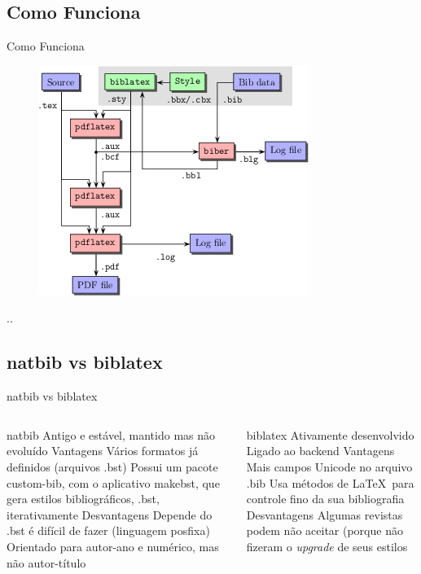 \documentclass{beamer}
\begin{document}
\subsection{Como Funciona}
\begin{frame}{Como Funciona}
    \begin{figure}
        \centering
        \includegraphics[width=0.7\linewidth]{Images/xMUL7}
        \caption{}
        \label{fig:xmul7}
    \end{figure}
    ..
\end{frame}

\subsection{natbib vs biblatex}
\begin{frame}[shrink=10]{natbib vs biblatex\cite{biber:2012}}
    \begin{columns}
        \begin{column}{0.5\linewidth}
\begin{outline}
    \1 natbib
    \2 Antigo e estável, mantido mas não evoluído
    \2 Vantagens
    \3 Vários formatos já definidos (arquivos .bst)
    \3 Possui um pacote custom-bib, com o aplicativo makebst, que gera estilos bibliográficos, .bst, iterativamente
    \2 Desvantagens
    \3 Depende do  
    \3 .bst é difícil de fazer (linguagem posfixa)
    \3 Orientado para autor-ano e numérico, mas não autor-título
\end{outline}
        \end{column}
    \begin{column}{0.5\linewidth}
\begin{outline}
    \1 biblatex
    \2 Ativamente desenvolvido
    \2 Ligado ao backend 
    \2 Vantagens
    \3 Mais campos
    \3 Unicode no arquivo .bib
    \3 Usa métodos de \LaTeX\ para controle fino da sua bibliografia
    \2 Desvantagens
    \3 Algumas revistas podem não aceitar (porque não fizeram o \textit{upgrade} de seus estilos
\end{outline}
    \end{column}
    \end{columns}

\end{frame}
\end{document}
